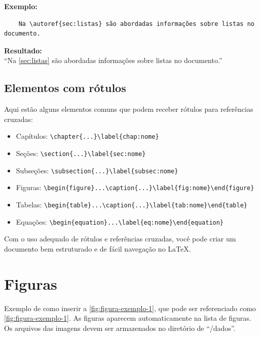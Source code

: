 \textbf{Exemplo:}
\begin{verbatim}
    Na \autoref{sec:listas} são abordadas informações sobre listas no documento.
\end{verbatim}

\textbf{Resultado:} \\
``Na \autoref{sec:listas} são abordadas informações sobre listas no documento.''

\subsection{Elementos com rótulos}
Aqui estão alguns elementos comuns que podem receber rótulos para referências cruzadas:
\begin{itemize}
    \item Capítulos: \texttt{\textbackslash chapter\{...\}\textbackslash label\{chap:nome\}}
    \item Seções: \texttt{\textbackslash section\{...\}\textbackslash label\{sec:nome\}}
    \item Subseções: \texttt{\textbackslash subsection\{...\}\textbackslash label\{subsec:nome\}}
    \item Figuras: \texttt{\textbackslash begin\{figure\}...\textbackslash caption\{...\}\textbackslash label\{fig:nome\}\textbackslash end\{figure\}}
    \item Tabelas: \texttt{\textbackslash begin\{table\}...\textbackslash caption\{...\}\textbackslash label\{tab:nome\}\textbackslash end\{table\}}
    \item Equações: \texttt{\textbackslash begin\{equation\}...\textbackslash label\{eq:nome\}\textbackslash end\{equation\}}
\end{itemize}
\vspace{0.5cm}
Com o uso adequado de rótulos e referências cruzadas, você pode criar um documento bem estruturado e de fácil navegação no \LaTeX{}. 

\section{Figuras}
\label{sec:figuras}

Exemplo de como inserir a \autoref{fig:figura-exemplo-1}, que pode ser referenciado como \cref{fig:figura-exemplo-1}. As figuras aparecem automaticamente na lista de figuras. Os arquivos das imagens devem ser armazenados no diretório de ``/dados''.

